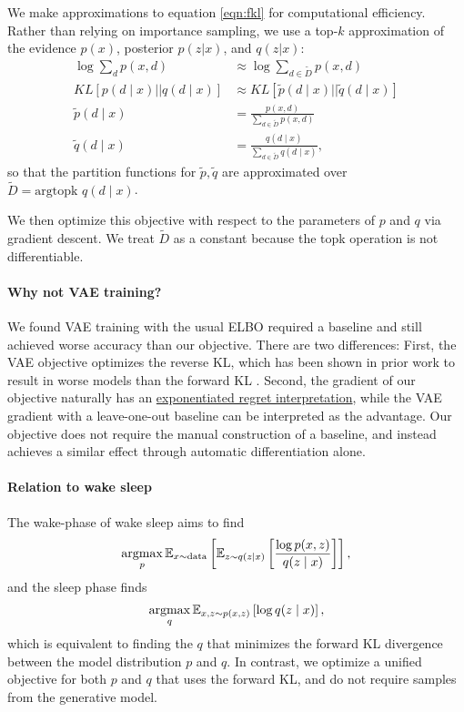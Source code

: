 \documentclass[11pt]{article}
\begin{document}
We make approximations to equation \ref{eqn:fkl} for computational efficiency.
Rather than relying on importance sampling, we use a top-$k$ approximation
of the evidence $p(x)$, posterior $p(z|x)$, and $q(z|x)$:
\begin{align*}
\log\sum_d p(x,d) &\approx \log\sum_{d\in \tilde{D}} p(x,d)\\
KL[p(d\mid x) || q(d \mid x)] &\approx KL[\tilde{p}(d\mid x) || \tilde{q}(d \mid x)]\\
\tilde{p}(d\mid x) &= \frac{p(x,d)}{\sum_{d \in \tilde{D}} p(x,d)}\\
\tilde{q}(d\mid x) &= \frac{q(d\mid x)}{\sum_{d \in \tilde{D}} q(d\mid x)},
\end{align*}
so that the partition functions for $\tilde{p},\tilde{q}$ are approximated over
$\tilde{D} = \text{argtopk } q(d\mid x)$.

We then optimize this objective with respect to the parameters of $p$ and $q$ 
via gradient descent. We treat $\tilde{D}$ as a constant because the topk operation
is not differentiable.

\paragraph{Why not VAE training?} We found VAE training with the usual ELBO
required a baseline and still achieved worse accuracy than our objective.
There are two differences:
First, the VAE objective optimizes the reverse KL, which has
been shown in prior work to result in worse models than the forward KL \cite{fkl}.
Second, the gradient of our objective naturally has an
\href{https://github.com/justinchiu/elbos-baselines}{exponentiated regret interpretation},
while the VAE gradient with a leave-one-out baseline can be interpreted as the advantage.
Our objective does not require the manual construction of a baseline,
and instead achieves a similar effect through automatic differentiation alone.

\paragraph{Relation to wake sleep} The wake-phase of wake sleep aims to find
\begin{equation}
\operatorname*{argmax}_p \mathbb{E}_{x\sim \text{data}}\left[\mathbb{E}_{z\sim q(z\mid x)}\left[\frac{\log p(x,z)}{q(z\mid x)}\right]\right],
\end{equation}
and the sleep phase finds
\begin{equation}
\operatorname*{argmax}_q \mathbb{E}_{x,z\sim p(x,z)}\left[\log q(z\mid x)\right],
\end{equation}
which is equivalent to finding the $q$ that minimizes the forward KL divergence
between the model distribution $p$ and $q$.
In contrast, we optimize a unified objective for both $p$ and $q$ that uses
the forward KL,
and do not require samples from the generative model.
\end{document}

